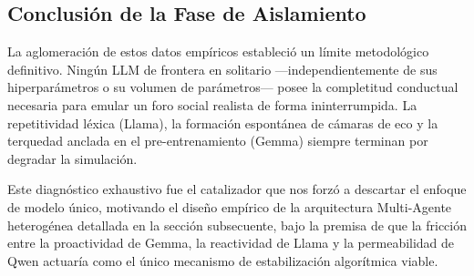 ﻿\documentclass{article}
\begin{document}
\subsection{Conclusión de la Fase de Aislamiento}

La aglomeración de estos datos empíricos estableció un límite metodológico definitivo. Ningún LLM de frontera en solitario —independientemente de sus hiperparámetros o su volumen de parámetros— posee la completitud conductual necesaria para emular un foro social realista de forma ininterrumpida. La repetitividad léxica (Llama), la formación espontánea de cámaras de eco y la terquedad anclada en el pre-entrenamiento (Gemma) siempre terminan por degradar la simulación. 

Este diagnóstico exhaustivo fue el catalizador que nos forzó a descartar el enfoque de modelo único, motivando el diseño empírico de la arquitectura Multi-Agente heterogénea detallada en la sección subsecuente, bajo la premisa de que la fricción entre la proactividad de Gemma, la reactividad de Llama y la permeabilidad de Qwen actuaría como el único mecanismo de estabilización algorítmica viable.
\end{document}
